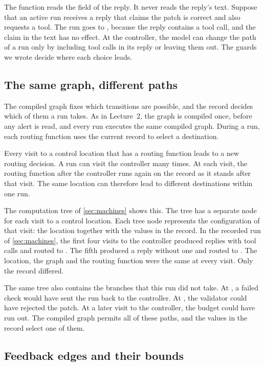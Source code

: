 The function reads the  field of the reply. It never reads the reply's text.
Suppose that an active run receives a reply that claims the patch is correct and also requests a
tool. The run goes to , because the reply contains a tool call, and the claim in
the text has no effect. At the controller, the model can change the path of a run only by including
tool calls in its reply or leaving them out. The guards we wrote decide where each choice leads.

\subsection{The same graph, different paths}
\label{sec:routing-paths}

The compiled graph fixes which transitions are possible, and the record decides which of them a run
takes. As in Lecture~2, the graph is compiled once, before any alert is read, and every run executes
the same compiled graph. During a run, each routing function uses the current record to select a
destination.

Every visit to a control location that has a routing function leads to a new routing decision. A
run can visit the controller many times. At each visit, the routing function after the controller
runs again on the record as it stands after that visit. The same location can therefore lead to
different destinations within one run.

The computation tree of \cref{sec:machines} shows this. The tree has a separate node for each visit
to a control location. Each tree node represents the configuration of that visit: the location
together with the values in the record. In the recorded run of \cref{sec:machines}, the first four
visits to the controller produced replies with tool calls and routed to . The
fifth produced a reply without one and routed to . The location, the graph and the
routing function were the same at every visit. Only the record differed.

The same tree also contains the branches that this run did not take. At , a failed
check would have sent the run back to the controller. At , the validator could
have rejected the patch. At a later visit to the controller, the budget could have run out. The
compiled graph permits all of these paths, and the values in the record select one of them.

\subsection{Feedback edges and their bounds}
\label{sec:routing-feedback}

